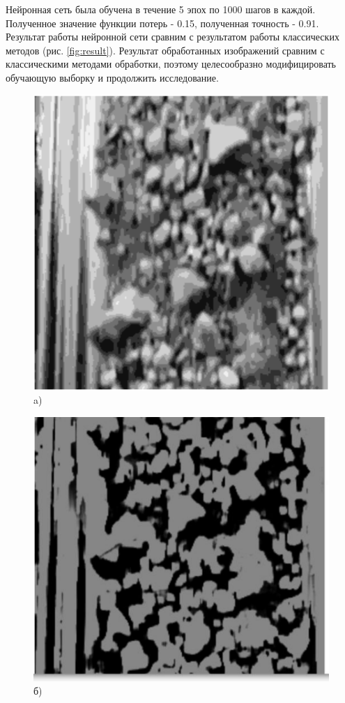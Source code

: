 \documentclass[times]{itmo-student-thesis}
\begin{document}
Нейронная сеть была обучена в течение 5 эпох по 1000 шагов в каждой. Полученное значение функции потерь  - 0.15, полученная точность - 0.91. Результат работы нейронной сети сравним с результатом работы классических методов (рис. \ref{fig:result}). Результат обработанных изображений сравним с классическими методами обработки, поэтому целесообразно модифицировать обучающую выборку и продолжить исследование.

\begin{figure}[h!]
	\begin{minipage}[h]{0.49\linewidth}
		\centering
		\includegraphics[width=\linewidth]{images/test1} \\ a)
	\end{minipage}
	\hfill
	\begin{minipage}[h]{0.49\linewidth}
		\centering
		\includegraphics[width=\linewidth]{images/test2} \\ б)

\end{minipage}
\end{figure}
\end{document}
